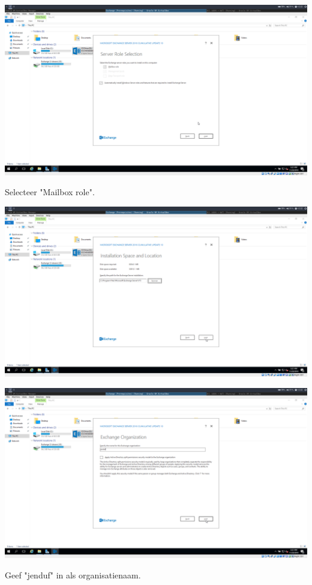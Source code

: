\documentclass[a4paper]{article}
\begin{document}
\begin{center}
	\includegraphics[width=15cm]{Pictures/Exchange/install/1542712969.png}
	
	Selecteer "Mailbox role".
\end{center}
\begin{center}
	\includegraphics[width=15cm]{Pictures/Exchange/install/1542712972.png}
	
	
\end{center}
\begin{center}
	\includegraphics[width=15cm]{Pictures/Exchange/install/1542712976.png}
	
	Geef "jenduf" in als organisatienaam.
\end{center}
\end{document}
